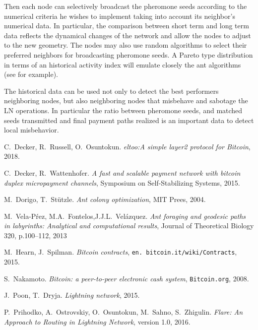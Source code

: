 \documentclass[12pt]{amsart}
\theoremstyle{remark}
\begin{document}
\medskip

Then each node can selectively broadcast the pheromone seeds according to the numerical criteria he wishes
to implement taking into account its neighbor's numerical data. 
In particular, the comparison between short term and long term data reflects the dynamical changes of the 
network and allow the nodes to adjust to the new geometry.
The nodes may also use random algorithms to select their preferred neighbors for broadcasting pheromone seeds. 
A Pareto type distribution in terms of an historical activity index will emulate closely the ant algorithms (see
\cite{FVV13} for example).

\medskip

The historical data can be used not only to detect the best performers neighboring nodes, but  also neighboring 
nodes that misbehave and sabotage the LN operations. In particular the ratio between pheromone seeds, and matched seeds 
transmitted and final payment paths realized is an important data to detect local misbehavior. 

\newpage
\begin{thebibliography}{1}


 C.~Decker, R.~Russell, O.~Osuntokun. \textit{eltoo:A simple layer2 protocol for Bitcoin}, 2018.


 C.~Decker, R.~Wattenhofer. \textit{A fast and scalable payment
network with bitcoin duplex micropayment channels}, Symposium on Self-Stabilizing Systems, 2015.

 M.~Dorigo, T.~St\"utzle. \textit{Ant colony optimization}, 
MIT Prees, 2004.


 M.~Vela-P\'rez, M.A.~Fontelos,J.J.L.~Velázquez. \textit{Ant foraging and 
geodesic paths in labyrinths: Analytical and computational results}, Journal of Theoretical 
Biology 320, p.100–112, 2013


 M.~Hearn, J.~Spilman. \textit{Bitcoin contracts}, \texttt{en.
bitcoin.it/wiki/Contracts}, 2015.


 S.~Nakamoto. \textit{Bitcoin: a peer-to-peer electronic cash system}, 
\texttt{Bitcoin.org}, 2008.

 J.~Poon, T.~Dryja. \textit{Lightning network}, 2015.

 P.~Prihodko, A.~Ostrovskiy, O.~Osuntokun, M.~Sahno, S.~Zhigulin. 
\textit{Flare: An Approach to Routing in Lightning Network}, version 1.0, 2016.

  

\end{thebibliography}
\end{document}

